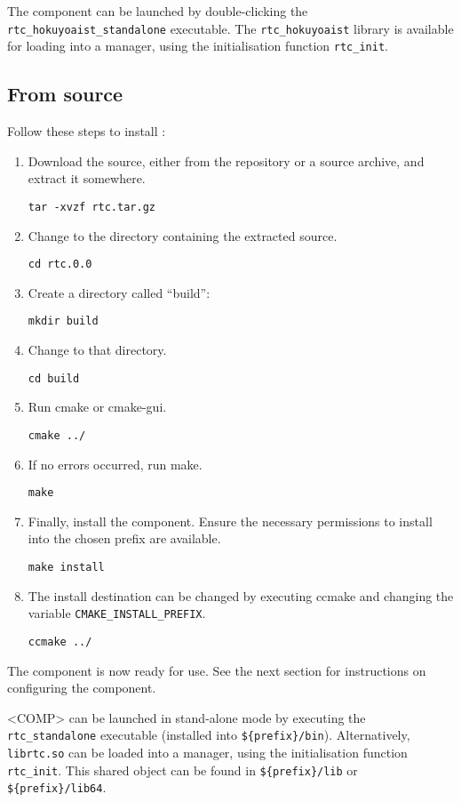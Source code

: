 \documentclass[a4paper,10pt]{article}
\begin{document}
The component can be launched by double-clicking the
\verb|rtc_hokuyoaist_standalone| executable. The \verb|rtc_hokuyoaist| library
is available for loading into a manager, using the initialisation function
\verb|rtc_init|.

\subsection{From source}

Follow these steps to install :

\begin{enumerate}
  \item Download the source, either from the repository or a source archive,
  and extract it somewhere.

  \verb|tar -xvzf rtc.tar.gz|
  \item Change to the directory containing the extracted source.

  \verb|cd rtc.0.0|
  \item Create a directory called ``build'':

  \verb|mkdir build|
  \item Change to that directory.

  \verb|cd build|
  \item Run cmake or cmake-gui.

  \verb|cmake ../|
  \item If no errors occurred, run make.

  \verb|make|
  \item Finally, install the component. Ensure the necessary permissions to
  install into the chosen prefix are available.

  \verb|make install|
  \item The install destination can be changed by executing ccmake and changing
  the variable \verb|CMAKE_INSTALL_PREFIX|.

  \verb|ccmake ../|
\end{enumerate}

The component is now ready for use. See the next section for instructions on
configuring the component.

<COMP> can be launched in stand-alone mode by executing the
\verb|rtc_standalone| executable (installed into \verb|${prefix}/bin|).
Alternatively, \verb|librtc.so| can be loaded into a manager, using the
initialisation function \verb|rtc_init|. This shared object can be found in
\verb|${prefix}/lib| or \verb|${prefix}/lib64|.
\end{document}
